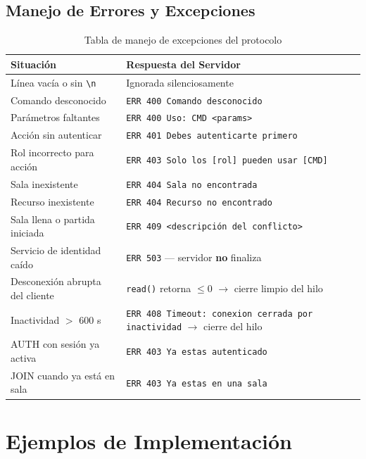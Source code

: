 \documentclass[12pt, letterpaper]{article}
\begin{document}
\subsection{Manejo de Errores y Excepciones}

\begin{table}[H]
\centering
\begin{tabularx}{\textwidth}{X X}
\toprule
\textbf{Situación} & \textbf{Respuesta del Servidor} \\
\midrule
Línea vacía o sin \texttt{\textbackslash{}n} & Ignorada silenciosamente \\
Comando desconocido & \texttt{ERR 400 Comando desconocido} \\
Parámetros faltantes & \texttt{ERR 400 Uso: CMD <params>} \\
Acción sin autenticar & \texttt{ERR 401 Debes autenticarte primero} \\
Rol incorrecto para acción & \texttt{ERR 403 Solo los [rol] pueden usar [CMD]} \\
Sala inexistente & \texttt{ERR 404 Sala no encontrada} \\
Recurso inexistente & \texttt{ERR 404 Recurso no encontrado} \\
Sala llena o partida iniciada & \texttt{ERR 409 <descripción del conflicto>} \\
Servicio de identidad caído & \texttt{ERR 503} --- servidor \textbf{no} finaliza \\
Desconexión abrupta del cliente & \texttt{read()} retorna $\leq 0$ $\rightarrow$ cierre limpio del hilo \\
Inactividad $>$ 600 s & \texttt{ERR 408 Timeout: conexion cerrada por inactividad} $\rightarrow$ cierre del hilo \\
AUTH con sesión ya activa & \texttt{ERR 403 Ya estas autenticado} \\
JOIN cuando ya está en sala & \texttt{ERR 403 Ya estas en una sala} \\
\bottomrule
\end{tabularx}
\caption{Tabla de manejo de excepciones del protocolo}
\end{table}

\section{Ejemplos de Implementación}
\end{document}
